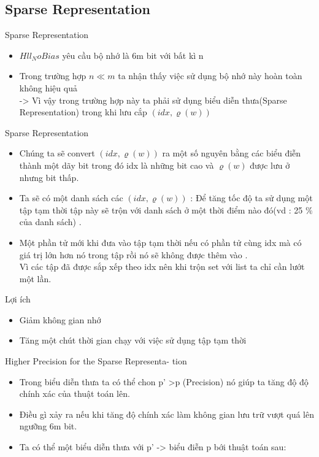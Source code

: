 \documentclass{beamer}
\newcommand{\bi}{\begin{itemize}}
\newcommand{\ei}{\end{itemize}}
\begin{document}
\subsection{Sparse Representation}
\begin{frame}{Sparse Representation}
\bi
\item $Hll_NoBias $ yêu cầu bộ nhớ là 6m bit với bất kì n  \\
\item Trong trường hợp $n\ll m $ ta nhận thấy việc sử dụng bộ nhớ này hoàn toàn không hiệu quả \\
-> Vì vậy trong trường hợp này ta  phải sử dụng biểu diễn thưa(Sparse Representation) trong khi lưu cắp $(idx,\varrho(w)) $ \\
\ei
\end{frame}
\begin{frame}{Sparse Representation}
\bi
\item Chúng ta sẽ convert $(idx,\varrho(w)) $ ra một số nguyên bằng các biểu điễn thành một dãy bit trong đó idx là những bit cao và $\varrho(w) $ được lưu ở nhưng bit thấp. \\
\item Ta sẽ có một danh sách các $(idx,\varrho(w)) $ :
Để tăng tốc độ ta sử dụng một tập tạm thời tập này sẽ trộn với danh sách ở một thời điểm nào đó(vd : 25 $\%$ của danh sách) .\\
\item Một phần tử mới khi đưa vào  tập tạm thời nếu có phần tử cùng idx mà có giá trị lớn hơn nó trong tập rồi nó sẽ không được thêm vào .\\
Vì các tập đã được sắp xếp theo idx nên khi trộn set với list ta chỉ cần lướt một lần.
\ei
\end{frame}
\begin{frame}{Lợi ích }
\begin{itemize}
\item Giảm không gian nhớ
\item Tăng một chút thời gian chạy với việc sử dụng tập tạm thời
\end{itemize}
\end{frame}
\begin{frame}{Higher Precision for the Sparse Representa-
tion} 
\bi
\item Trong biểu diễn thưa ta có thể chon p' >p (Precision) nó giúp ta tăng độ  độ chính xác của thuật toán lên.\\

\item Điều gì xảy ra nếu khi tăng độ chính xác làm không gian lưu trữ vượt quá lên ngưỡng 6m bit.\\
\item Ta có thể một biểu diễn thưa với p' -> biểu điễn p bới thuật toán sau:
\ei 
\end{frame}
\end{document}

